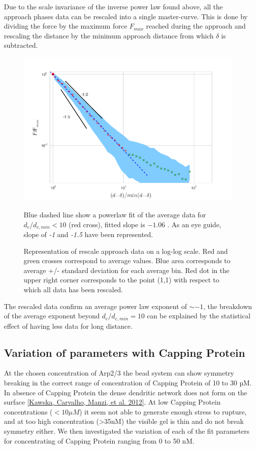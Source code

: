 \documentclass[A4paperpaper,11pt,english]{sphinxmanual}
\begin{document}
Due to the scale invariance of the inverse power law found above,  all the
approach phases data can be rescaled into a single master-curve. This is done
by dividing the force by the maximum force \(F_{max}\) reached during the
approach and rescaling the distance by the minimum approach distance from which
\(\delta\) is subtracted.
\begin{figure}[htbp]
\centering
\capstart

\includegraphics[width=0.800\linewidth]{rescaled_powerlaw.png}
\caption{Representation of rescale approach data on a log-log scale.  Red and green
crosses correspond to average values. Blue area corresponds to average +/-
standard deviation for each average bin. Red dot in the upper right corner
corresponds to the point (1,1) with respect to which all data has been
rescaled.}{\small 
Blue dashed line show a powerlaw fit of the average data for
\(d_c/d_{c,min} < 10\) (red cross), fitted slope is \(-1.06\) .
As an eye guide, slope of \emph{-1} and \emph{-1.5} have been represented.
}\end{figure}

The rescaled data confirm an average power law exponent of \(\sim -1\), the
breakdown of the average exponent beyond \(d_c/d_{c,min}=10\) can be
explained by the statistical effect of having less data for long distance.


\subsection{Variation of parameters with Capping Protein}
\label{parts/part3:variation-of-parameters-with-capping-protein}
At the chosen concentration of Arp2/3 the bead system can show symmetry
breaking in the correct range of concentration of Capping Protein of 10 to 30
µM. In absence of Capping Protein the dense dendritic network does not form on
the surface {\hyperref[parts/part3:kawska2012]{{[}Kawska, Carvalho, Manzi,  et al.  2012{]}}}. At low Capping Protein concentrations (\(<10 \mu{}M\)) it seem not able to generate enough stress to
rupture, and at too high concentration (\textgreater{}35nM) the visible gel is thin and do
not break symmetry either. We then investigated the variation of each of the
fit parameters for concentrating of Capping Protein ranging from 0 to 50 nM.
\end{document}
